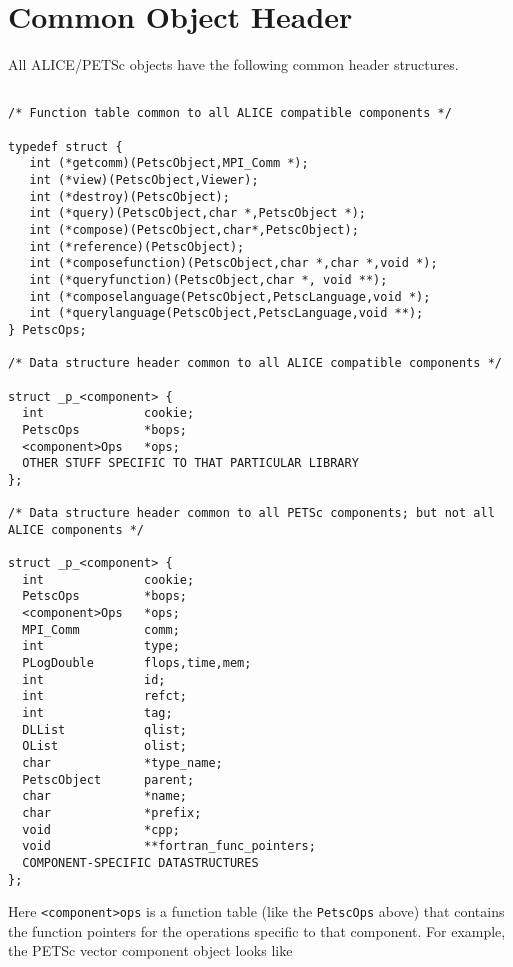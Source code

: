 \documentclass[twoside,12pt]{../sty/report_petsc}
\begin{document}
\section{Common Object Header}

All ALICE/PETSc objects have the following common header structures.

\begin{verbatim}

/* Function table common to all ALICE compatible components */

typedef struct {
   int (*getcomm)(PetscObject,MPI_Comm *);
   int (*view)(PetscObject,Viewer);
   int (*destroy)(PetscObject);
   int (*query)(PetscObject,char *,PetscObject *);
   int (*compose)(PetscObject,char*,PetscObject);
   int (*reference)(PetscObject);
   int (*composefunction)(PetscObject,char *,char *,void *);
   int (*queryfunction)(PetscObject,char *, void **);
   int (*composelanguage(PetscObject,PetscLanguage,void *);
   int (*querylanguage(PetscObject,PetscLanguage,void **);
} PetscOps;

/* Data structure header common to all ALICE compatible components */

struct _p_<component> {
  int              cookie;                                  
  PetscOps         *bops;                                   
  <component>Ops   *ops;       
  OTHER STUFF SPECIFIC TO THAT PARTICULAR LIBRARY
};

/* Data structure header common to all PETSc components; but not all ALICE components */

struct _p_<component> {
  int              cookie;                                  
  PetscOps         *bops;                                   
  <component>Ops   *ops;                                    
  MPI_Comm         comm;                                    
  int              type;                                    
  PLogDouble       flops,time,mem;                          
  int              id;                                      
  int              refct;                                   
  int              tag;                                     
  DLList           qlist;                                   
  OList            olist;                                   
  char             *type_name;                              
  PetscObject      parent;                                  
  char             *name;                                    
  char             *prefix;                                 
  void             *cpp;
  void             **fortran_func_pointers;       
  COMPONENT-SPECIFIC DATASTRUCTURES
}; 

\end{verbatim}
Here {\tt <component>ops} is a function table (like the {\tt PetscOps} above) that 
contains the function pointers for the operations specific to that component.
For example, the PETSc vector component object looks like
\end{document}
